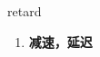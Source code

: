 
\begin{frame}
{\huge retard}
\begin{center}
\begin{enumerate}\Large
  \item \textbf{减速，延迟}
\end{enumerate}
\end{center}
\end{frame}
